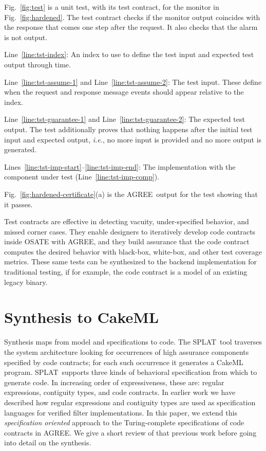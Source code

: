 \documentclass[global,twocolumn]{svjour}
\newcommand{\figref}[1]{Fig.~\ref{#1}}
\newcommand{\lineref}[1]{Line~\ref{#1}}
\newcommand{\linesref}[2]{Lines~\ref{#1}--\ref{#2}}
\newcommand{\agr}{AGREE}
\newcommand{\splt}{SPLAT}
\newcommand{\ie}{\textit{i.e.}}
\begin{document}
\figref{fig:test} is a unit test, with its test contract, for the monitor in \figref{fig:hardened}.
%
The test contract checks if the monitor output coincides with the response that comes one step after the request.
%
It also checks that the alarm is not output.
%
\begin{compactitem}
\item \lineref{line:tst-index}: An index to use to define the test input and expected test output through time.
\item \lineref{line:tst-assume-1} and \lineref{line:tst-assume-2}: The test input. These define when the request and response message events should appear relative to the index.
\item \lineref{line:tst-guarantee-1} and \lineref{line:tst-guarantee-2}: The expected test output.
The test additionally proves that nothing happens after the initial test input and expected output, \ie, no more input is provided and no more output is generated.
\item \linesref{line:tst-imp-start}{line:tst-imp-end}: The implementation with the component under test (\lineref{line:tst-imp-comp}).
\end{compactitem}
%
\figref{fig:hardened-certificate}(a) is the \agr\ output for the test showing that it passes.

Test contracts are effective in detecting vacuity, under-specified behavior, and missed corner cases.
%
They enable designers to iteratively develop code contracts inside OSATE with \agr, and they build assurance that the code contract computes the desired behavior with black-box, white-box, and other test coverage metrics.
%
These same tests can be synthesized to the backend implementation for traditional testing, if for example, the code contract is a model of an existing legacy binary.


\section{Synthesis to CakeML}
\label{sec:synthesis}

Synthesis maps from model and specifications to code.
%
The \splt\ tool traverses the system architecture looking for occurrences of high assurance components specified by code contracts;
%
for each such occurrence it generates a CakeML program.
%
\splt\ supports three kinds of behavioral specification from which to generate code.
%
In increasing order of expressiveness, these are: regular expressions, contiguity types, and code contracts.
%
In earlier work we have described how regular expressions and contiguity types are used as specification languages for verified filter implementations.
%
In this paper, we extend this \emph{specification oriented} approach to the Turing-complete specifications of code contracts in \agr.
%
We give a short review of that previous work before going into detail on the synthesis.
\end{document}
